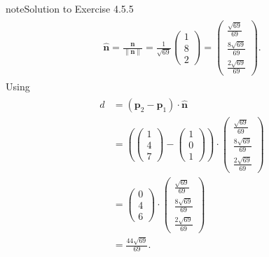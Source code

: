 \documentclass[letterpaper,10pt,english]{jupyterBook}
\begin{document}
\begin{sphinxadmonition}{note}{Solution to Exercise 4.5.5}
\begin{equation*}
\begin{split}
\begin{align*}
    \hat{\mathbf{n}} = \frac{\mathbf{n}}{\|\mathbf{n}\|} = \frac{1}{\sqrt{69}} 
    \begin{pmatrix} 1 \\ 8 \\ 2 \end{pmatrix} =
    \begin{pmatrix} \frac{\sqrt{69}}{69} \\ \frac{8\sqrt{69}}{69} \\ \frac{2\sqrt{69}}{69} \end{pmatrix}.
\end{align*} \end{split}
\end{equation*}
\sphinxAtStartPar
Using {\hyperref[\detokenize{_pages/4.3_Shortest_distance_problems:line-line-distance-theorem}]{}}
\begin{equation*}
\begin{split} \begin{align*}
    d &= (\mathbf{p}_2 - \mathbf{p}_1) \cdot \hat{\mathbf{n}} \\
    &= \left( \begin{pmatrix} 1 \\ 4 \\ 7 \end{pmatrix} -
    \begin{pmatrix} 1 \\ 0 \\ 1 \end{pmatrix} \right) \cdot
    \begin{pmatrix} \frac{\sqrt{69}}{69} \\ \frac{8\sqrt{69}}{69} \\ \frac{2\sqrt{69}}{69} \end{pmatrix} \\
    &= \begin{pmatrix} 0 \\ 4 \\ 6 \end{pmatrix} \cdot
    \begin{pmatrix} \frac{\sqrt{69}}{69} \\ \frac{8\sqrt{69}}{69} \\ \frac{2\sqrt{69}}{69} \end{pmatrix} \\
    &= \frac{44\sqrt{69}}{69}.
\end{align*} \end{split}
\end{equation*}\end{sphinxadmonition}
 \label{_pages/A4_Coordinate_geometry_exercises_solutions:_pages/A4_Coordinate_geometry_exercises_solutions-solution-5}
\end{document}
